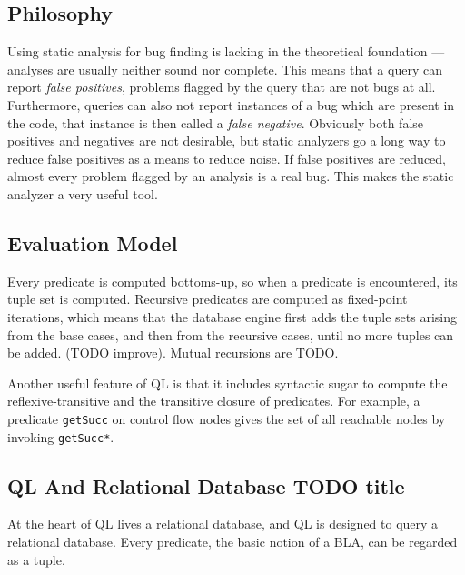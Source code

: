 \subsection{Philosophy}
Using static analysis for bug finding is lacking in the theoretical foundation {---} 
analyses are usually neither sound nor complete.
This means that a query can report \emph{false positives}, problems flagged by the query that 
are not bugs at all.
Furthermore, queries can also not report instances of a bug which are present in the code,
that instance is then called a \emph{false negative}.
Obviously both false positives and negatives are not desirable, but static analyzers go a long way
to reduce false positives as a means to reduce noise.
If false positives are reduced, almost every problem flagged by an analysis is a real bug.
This makes the static analyzer a very useful tool.

\cite{qlpaper}
\subsection{Evaluation Model}
Every predicate is computed bottoms-up, so when a predicate is encountered, its
tuple set is computed.
Recursive predicates are computed as fixed-point iterations, which means that the database engine 
first adds the tuple sets arising from the base cases, and then from the recursive cases, until
no more tuples can be added. (TODO improve).
Mutual recursions are TODO.

Another useful feature of QL is that it includes syntactic sugar to compute the reflexive-transitive
and the transitive closure of predicates.
For example, a predicate \texttt{getSucc} on control flow nodes gives the set of all reachable
nodes by invoking \texttt{getSucc*}.

\subsection{QL And Relational Database TODO title}
At the heart of QL lives a relational database, and QL is designed to query a relational database.
Every predicate, the basic notion of a BLA, can be regarded as a tuple.

